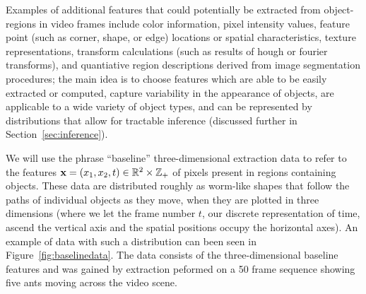 \documentclass[smallcondensed, final]{svjour3}
\begin{document}
Examples of additional features that could potentially be extracted from object-regions in video frames include color information, pixel intensity values, feature point (such as corner, shape, or edge) locations or spatial characteristics, texture representations, transform calculations (such as results of hough or fourier transforms), and quantiative region descriptions derived from image segmentation procedures; the main idea is to choose features which are able to be easily extracted or computed, capture variability in the appearance of objects, are applicable to a wide variety of object types, and can be represented by distributions that allow for tractable inference (discussed further in Section~\ref{sec:inference}).

We will use the phrase ``baseline'' three-dimensional extraction data to refer to the features $\bold{x} = ( x_{1}, x_{2}, t ) \in \mathbb{R}^{2} \times \mathbb{Z}_{+}$ of pixels present in regions containing objects. These data are distributed roughly as worm-like shapes that follow the paths of individual objects as they move, when they are plotted in three dimensions (where we let the frame number $t$, our discrete representation of time, ascend the vertical axis and the spatial positions occupy the horizontal axes). An example of data with such a distribution can been seen in Figure~\ref{fig:baselinedata}. The data consists of the three-dimensional baseline features and was gained by extraction peformed on a 50 frame sequence showing five ants moving across the video scene.

\end{document}
